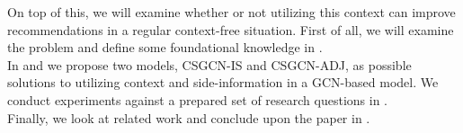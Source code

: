 On top of this, we will examine whether or not utilizing this context can improve recommendations in a regular context-free situation.
First of all, we will examine the problem and define some foundational knowledge in .\\
In  and  we propose two models, CSGCN-IS and CSGCN-ADJ, as possible solutions to utilizing context and side-information in a GCN-based model.
We conduct experiments against a prepared set of research questions in .\\
Finally, we look at related work and conclude upon the paper in .
\\\\
